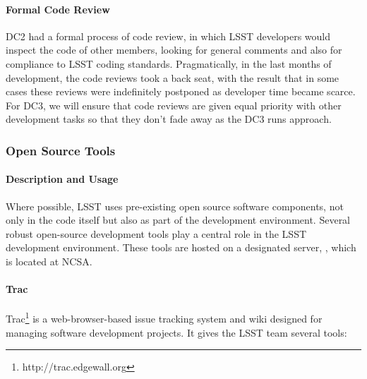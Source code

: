 \paragraph{Formal Code Review}

DC2 had a formal process of code review, in which LSST developers would inspect
the code of other members, looking for general comments and also for compliance
to LSST coding standards. Pragmatically, in the last months of development, the
code reviews took a back seat, with the result that in some cases these reviews
were indefinitely postponed as developer time became scarce. For DC3, we will
ensure that code reviews are given equal priority with other development tasks
so that they don't fade away as the DC3 runs approach.

\subsubsection{Open Source Tools}

\paragraph{Description and Usage}
Where possible, LSST uses pre-existing open source software components, not only
in the code itself but also as part of the development environment. Several
robust open-source development tools play a central role in the LSST development
environment. These tools are hosted on a designated server,
, which is located at NCSA.

\paragraph{Trac} Trac\footnote{http://trac.edgewall.org} is a web-browser-based
issue tracking system and wiki designed for managing software development
projects. It gives the LSST team several tools:

